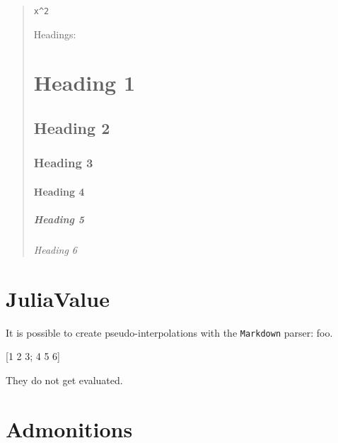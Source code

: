 \begin{quote}

\begin{lstlisting}[]
x^2
\end{lstlisting}

Headings:

\chapter{Heading 1}

\section{Heading 2}

\subsection{Heading 3}

\subsubsection{Heading 4}

\paragraph{Heading 5}\indent

\subparagraph{Heading 6}\indent

\end{quote}


\chapter{JuliaValue}



\label{8207632397694604507}{}


It is possible to create pseudo-interpolations with the \texttt{Markdown} parser: foo.



[1 2 3; 4 5 6]



They do not get evaluated.



\chapter{Admonitions}



\label{1916796393499649241}{}


